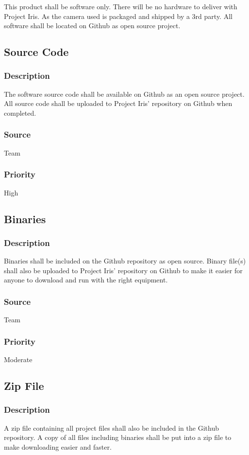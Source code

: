 This product shall be software only. There will be no hardware to deliver with Project Iris. As the camera used is packaged and shipped by a 3rd party. All software shall be located on Github as open source project.
\subsection{Source Code}
\subsubsection{Description}
The software source code shall be available on Github as an open source project. All source code shall be uploaded to Project Iris' repository on Github when completed.
\subsubsection{Source}
Team
\subsubsection{Priority}
High
\subsection{Binaries}
\subsubsection{Description}
Binaries shall be included on the Github repository as open source. Binary file(s) shall also be uploaded to Project Iris' repository on Github to make it easier for anyone to download and run with the right equipment.
\subsubsection{Source}
Team
\subsubsection{Priority}
Moderate
\subsection{Zip File}
\subsubsection{Description}
A zip file containing all project files shall also be included in the Github repository. A copy of all files including binaries shall be put into a zip file to make downloading easier and faster.
